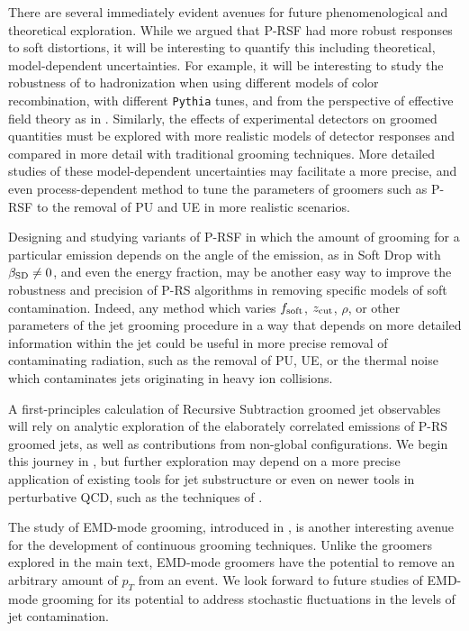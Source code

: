    There are several immediately evident avenues for future phenomenological and theoretical exploration.
    While we argued that P-RSF had more robust responses to soft distortions, it will be interesting to quantify this including theoretical, model-dependent uncertainties.
   For example, it will be interesting to study the robustness of  to hadronization when using different models of color recombination, with different \texttt{Pythia} tunes, and from the perspective of effective field theory as in .
   Similarly, the effects of experimental detectors on  groomed quantities must be explored with more realistic models of detector responses and compared in more detail with traditional grooming techniques.
   More detailed studies of these model-dependent uncertainties may facilitate a more precise, and even process-dependent method to tune the parameters of \PIRANHA{} groomers such as P-RSF to the removal of PU and UE in more realistic scenarios.

   Designing and studying variants of P-RSF in which the amount of grooming for a particular emission depends on the angle of the emission, as in Soft Drop with \(\beta_{\rm SD} \neq 0\), and even the energy fraction, may be another easy way to improve the robustness and precision of P-RS algorithms in removing specific models of soft contamination.
   Indeed, any method which varies \(f_{\rm soft}\), \(z_{\rm cut}\), \(\rho\), or other parameters of the jet grooming procedure in a way that depends on more detailed information within the jet could be useful in more precise removal of contaminating radiation, such as the removal of PU, UE, or the thermal noise which contaminates jets originating in heavy ion collisions.

       A first-principles calculation of Recursive Subtraction groomed jet observables will rely on analytic exploration of the elaborately correlated emissions of P-RS groomed jets, as well as contributions from non-global configurations.
    We begin this journey in , but further exploration may depend on a more precise application of existing tools for jet substructure or even on newer tools in perturbative QCD, such as the techniques of .

   The study of EMD-mode \PIRANHA{} grooming, introduced in , is another interesting avenue for the development of continuous grooming techniques.
   Unlike the \PIRANHA{} groomers explored in the main text, EMD-mode \PIRANHA{} groomers have the potential to remove an arbitrary amount of \(p_T\) from an event.
   We look forward to future studies of EMD-mode grooming for its potential to address stochastic fluctuations in the levels of jet contamination.

